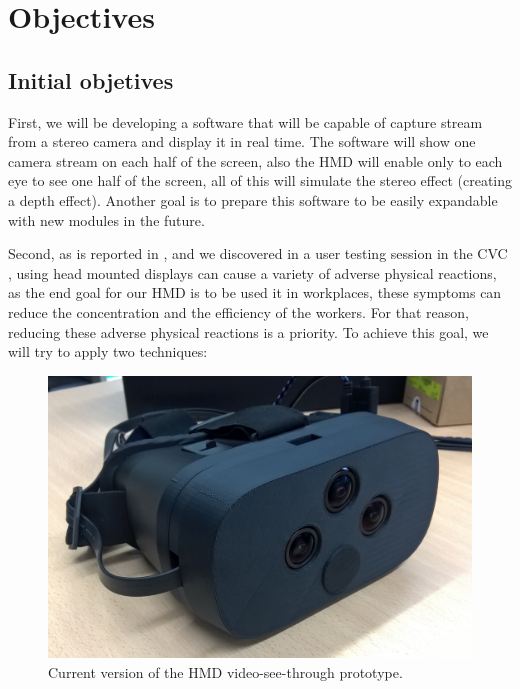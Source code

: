 \documentclass[10pt,a4paper,twocolumn,twoside]{article}
\begin{document}
	
	
	\section{Objectives}
	
	\subsection{Initial objetives}
	First, we will be developing a software that will be capable of capture stream from a stereo camera and display it in real time. The software will show one camera stream on each half of the screen, also the HMD will enable only to each eye to see one half of the screen, all of this will simulate the stereo effect (creating a depth effect). Another goal is to prepare this software to be easily expandable with new modules in the future.
	
	Second, as is reported in \cite{disconfortReview}, and we discovered in a user testing session in the CVC \cite{unpublishCVC}, using head mounted displays can cause a variety of adverse physical reactions, as the end goal for our HMD is to be used it in workplaces, these symptoms can reduce the concentration and the efficiency of the workers. For that reason, reducing these adverse physical reactions is a priority. To achieve this goal, we will try to apply two techniques: 
	
	\begin{figure}
		\centering
		\includegraphics[width=1\linewidth]{img/imagenproto3.jpg}
		\caption{Current version of the HMD video-see-through prototype.}
		\label{fig:proto}
	\end{figure}
	
\end{document}
